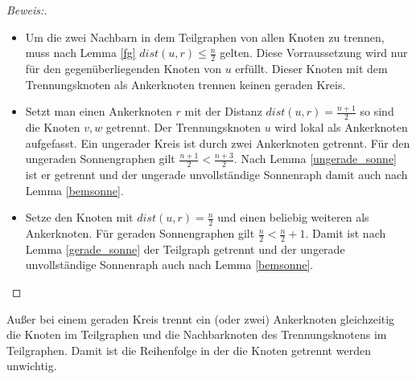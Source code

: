 \begin{proof}[Beweis:]
\begin{itemize}
\item Um die zwei Nachbarn in dem Teilgraphen von allen Knoten zu trennen, muss nach Lemma \ref{fg} $dist(u,r)\leq \frac{n}{2}$ gelten. Diese Vorraussetzung wird nur für den gegenüberliegenden Knoten von $u$ erfüllt. Dieser Knoten mit dem Trennungsknoten als Ankerknoten trennen keinen geraden Kreis.
\item  Setzt man einen Ankerknoten $r$ mit der Distanz $dist(u,r)= \frac{n+1}{2}$ so sind die Knoten $v,w$ getrennt. Der Trennungsknoten $u$ wird lokal als Ankerknoten aufgefasst. Ein ungerader Kreis ist durch zwei Ankerknoten getrennt. Für den ungeraden Sonnengraphen gilt $\frac{n+1}{2}< \frac{n+3}{2}$. Nach Lemma \ref{ungerade_sonne} ist er getrennt und der ungerade unvollständige Sonnenraph damit auch nach Lemma \ref{bemsonne}.
\item Setze den Knoten mit $dist(u,r)= \frac{n}{2}$ und einen beliebig weiteren als Ankerknoten. Für geraden Sonnengraphen gilt $\frac{n}{2}< \frac{n}{2}+1$. Damit ist nach Lemma \ref{gerade_sonne} der Teilgraph getrennt und der ungerade unvollständige Sonnenraph auch nach Lemma \ref{bemsonne}.
\end{itemize}
\vspace{-2mm}
\end{proof}
\vspace{-3mm}
Außer bei einem geraden Kreis trennt ein (oder zwei) Ankerknoten gleichzeitig die Knoten im Teilgraphen und die Nachbarknoten des Trennungsknotens im Teilgraphen. Damit ist die Reihenfolge in der die Knoten getrennt werden unwichtig.
\newpage
\vspace{-2mm}
